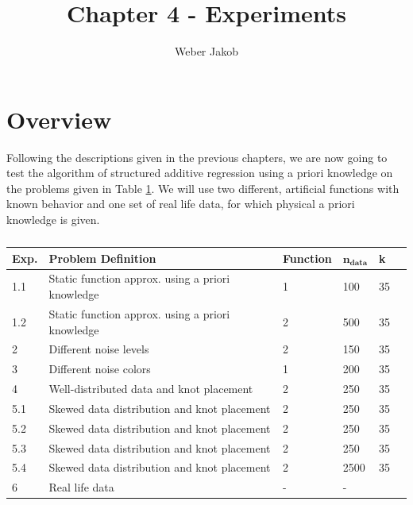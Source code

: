 \documentclass[10pt,a4paper]{article}
\title{Chapter 4 - Experiments}
\author{Weber Jakob}
\begin{document}
	\maketitle
	
\tableofcontents

\section{Overview}

Following the descriptions given in the previous chapters, we are now going to test the algorithm of structured additive regression using a priori knowledge on the problems given in Table \ref{tab:experiments}. We will use two different, artificial functions with known behavior and one set of real life data, for which physical a priori knowledge is given. 

\begin{table}[h]
	\begin{tabular}{|l|l|l|l|l|l|}
		\hline
		\textbf{Exp.} & \textbf{Problem Definition} & \textbf{Function} & \textbf{$\boldsymbol{n_{data}}$} & \textbf{k}  \\ \hline \toprule
		1.1 & Static function approx. using a priori knowledge & 1 & 100 & 35  \\ \hline
		1.2 & Static function approx. using a priori knowledge & 2 & 500 & 35  \\ \hline
		2   & Different noise levels                                 & 2 & 150 & 35  \\ \hline
		3   & Different noise colors                                 & 1 & 200 & 35  \\ \hline
		4   & Well-distributed data and knot placement               & 2 & 250 & 35  \\ \hline
		5.1 & Skewed data distribution and knot placement            & 2 & 250  & 35  \\ \hline
		5.2 & Skewed data distribution and knot placement            & 2 & 250  & 35  \\ \hline
		5.3 & Skewed data distribution and knot placement            & 2 & 250  & 35  \\ \hline
		5.4 & Skewed data distribution and knot placement            & 2 & 2500 & 35  \\ \hline
		6   & Real life data                                         & - & -   &    \\ \hline \bottomrule
	\end{tabular}
	\caption{}
	\label{tab:experiments}
\end{table}
\end{document}
